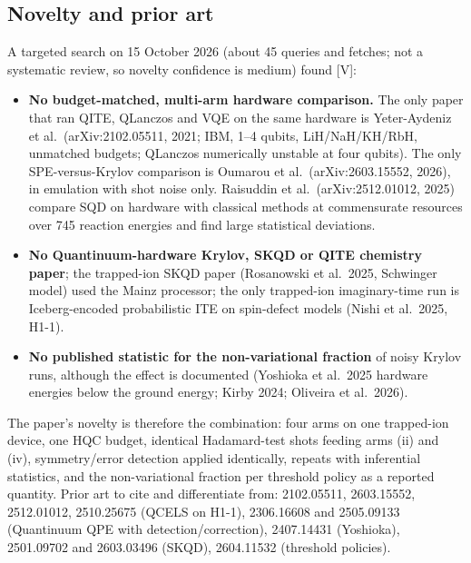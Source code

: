 \documentclass[11pt,a4paper]{article}
\newcommand{\lV}{\textcolor{keyblue}{[V]}}   %
\begin{document}
\subsection{Novelty and prior art}\label{sec:novelty}
A targeted search on 15 October 2026 (about 45 queries and fetches; not a systematic review, so novelty confidence is medium) found \lV:
\begin{itemize}
\item \textbf{No budget-matched, multi-arm hardware comparison.} The only paper that ran QITE, QLanczos and VQE on the same hardware is Yeter-Aydeniz et al.\ (arXiv:2102.05511, 2021; IBM, 1--4 qubits, LiH/NaH/KH/RbH, unmatched budgets; QLanczos numerically unstable at four qubits). The only SPE-versus-Krylov comparison is Oumarou et al.\ (arXiv:2603.15552, 2026), in emulation with shot noise only. Raisuddin et al.\ (arXiv:2512.01012, 2025) compare SQD on hardware with classical methods at commensurate resources over 745 reaction energies and find large statistical deviations.
\item \textbf{No Quantinuum-hardware Krylov, SKQD or QITE chemistry paper}; the trapped-ion SKQD paper (Rosanowski et al.\ 2025, Schwinger model) used the Mainz processor; the only trapped-ion imaginary-time run is Iceberg-encoded probabilistic ITE on spin-defect models (Nishi et al.\ 2025, H1-1).
\item \textbf{No published statistic for the non-variational fraction} of noisy Krylov runs, although the effect is documented (Yoshioka et al.\ 2025 hardware energies below the ground energy; Kirby 2024; Oliveira et al.\ 2026).
\end{itemize}
The paper's novelty is therefore the combination: four arms on one trapped-ion device, one HQC budget, identical Hadamard-test shots feeding arms (ii) and (iv), symmetry/error detection applied identically, repeats with inferential statistics, and the non-variational fraction per threshold policy as a reported quantity. Prior art to cite and differentiate from: 2102.05511, 2603.15552, 2512.01012, 2510.25675 (QCELS on H1-1), 2306.16608 and 2505.09133 (Quantinuum QPE with detection/correction), 2407.14431 (Yoshioka), 2501.09702 and 2603.03496 (SKQD), 2604.11532 (threshold policies).
\end{document}
